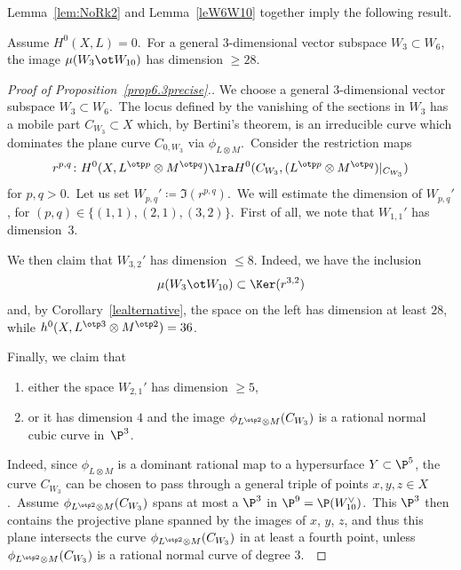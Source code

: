 Lemma~\ref{lem:NoRk2} and Lemma~\ref{leW6W10} together imply the following result.

\begin{coro}\label{lealternative}
Assume $H^0(X,L)=0$.\ For a general $3$-dimensional vector subspace $W_3\subset W_6$, the image $\mu(W_3\ot  W_{10})$ has dimension $\geq 28$.
\end{coro}

\begin{proof}[Proof of Proposition~\ref{prop6.3precise}.]
We choose a general $3$-dimensional vector subspace $W_3\subset W_6$.\
The locus
defined by the vanishing of the sections in $W_3$ has a mobile part $C_{W_3}\subset X$ which, by Bertini's theorem, is an irreducible curve
which   dominates the  plane curve $C_{0,W_3}$ via $\phi_{L\otimes M}$.\ Consider the restriction maps
\[
r^{p,q}\colon H^0(X,L^{\otp p}\otimes M^{\otp q})\lra  H^0(C_{W_3},(L^{\otp p}\otimes M^{\otp q})\vert_{C_{W_3}})
\]
for $p,q>0$.\
Let us set $W_{p,q}'\coloneqq \Im(r^{p,q})$.\
We will estimate the dimension of $W_{p,q}'$, for $(p,q)\in\{(1,1),(2,1), (3,2)\}$.\
First of all, we note that $W_{1,1}'$ has dimension~3.

We then claim that $W_{3,2}'$ has dimension $\leq 8$.
Indeed, we have the inclusion
\[
\mu(W_3\ot W_{10})\subset \Ker (r^{3,2})
\]
and, by Corollary~\ref{lealternative},   the space on the left has dimension at least $28$, while $h^0(X,L^{\otp 3}\otimes M^{\otp 2})=36$.

Finally, we claim that
\begin{enumerate}[{\rm (a)}]
\item\label{enum:claim1_part1} either the space $W_{2,1}'$ has dimension $\geq 5$,
\item\label{enum:claim1_part2} or it has dimension $4$ and the image $\phi_{L^{\otp 2}\otimes M}( C_{W_3})$ is a rational normal cubic curve in~$\P^3$.
\end{enumerate}
Indeed, since $\phi_{L\otimes M}$ is a dominant rational map to a hypersurface $Y\subset \P^5$, the curve $C_{W_3}$ can be chosen to pass through a  general triple of points $x,y,z\in X$.\
Assume  $\phi_{L^{\otp 2}\otimes M}( C_{W_3})$ spans at most a $\P^3$ in $\P^9=\P(W_{10}^\vee)$.\
This $\P^3$ then contains the projective plane  spanned by the images of $x$, $y$,  $z$, and thus this plane intersects the curve $\phi_{L^{\otp 2}\otimes M}(C_{W_3})$ in at least a fourth point, unless   $\phi_{L^{\otp 2}\otimes M}(C_{W_3})$ is a rational normal curve of degree $3$.\


\end{proof}
